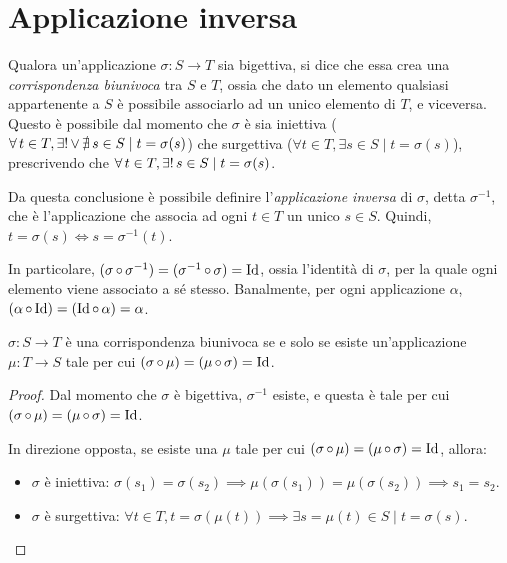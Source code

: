\section{Applicazione inversa}

Qualora un'applicazione $\sigma : S \to T$ sia bigettiva, si dice che essa
crea una \textit{corrispondenza biunivoca} tra $S$ e $T$, ossia che dato un
elemento qualsiasi appartenente a $S$ è possibile associarlo ad un unico elemento
di $T$, e viceversa. Questo è possibile dal momento che $\sigma$ è sia iniettiva
($\forall t \in T, \existsone \lor \nexists s \in S \mid t = \sigma(s)$) che
surgettiva ($\forall t \in T, \exists s \in S \mid t = \sigma(s)$), prescrivendo
che $\forall t \in T, \existsone s \in S \mid t = \sigma(s)$.

Da questa conclusione è possibile definire l'\textit{applicazione inversa} di
$\sigma$, detta $\sigma^{-1}$, che è l'applicazione che associa ad ogni $t \in T$
un unico $s \in S$. Quindi, $t = \sigma(s) \iff s = \sigma^{-1} (t)$.

In particolare, $(\sigma \circ \sigma^{-1}) = (\sigma^{-1} \circ \sigma) = \Id$,
ossia l'identità di $\sigma$, per la quale ogni elemento viene associato a sé stesso.
Banalmente, per ogni applicazione $\alpha$, $(\alpha \circ \Id) = (\Id \circ \alpha) = \alpha$.

\begin{lemma}
    \label{lemma:inversa_applicazione}
    $\sigma : S \to T$ è una corrispondenza biunivoca se e solo se
    esiste un'applicazione $\mu : T \to S$ tale per cui
    $(\sigma \circ \mu) = (\mu \circ \sigma) = \Id$.
\end{lemma}

\begin{proof}
    Dal momento che $\sigma$ è bigettiva, $\sigma^{-1}$ esiste, e questa è
    tale per cui $(\sigma \circ \mu) = (\mu \circ \sigma) = \Id$.

    In direzione opposta, se esiste una $\mu$ tale per cui $(\sigma \circ \mu) =
    (\mu \circ \sigma) = \Id$, allora:

    \begin{itemize}
        \item $\sigma$ è iniettiva: $\sigma(s_1) = \sigma(s_2) \implies
        \mu(\sigma(s_1)) = \mu(\sigma(s_2)) \implies s_1 = s_2$.
        \item $\sigma$ è surgettiva: $\forall t \in T, t = \sigma(\mu(t)) \implies
        \exists s = \mu(t) \in S \mid t = \sigma(s)$.
    \end{itemize}
\end{proof}

